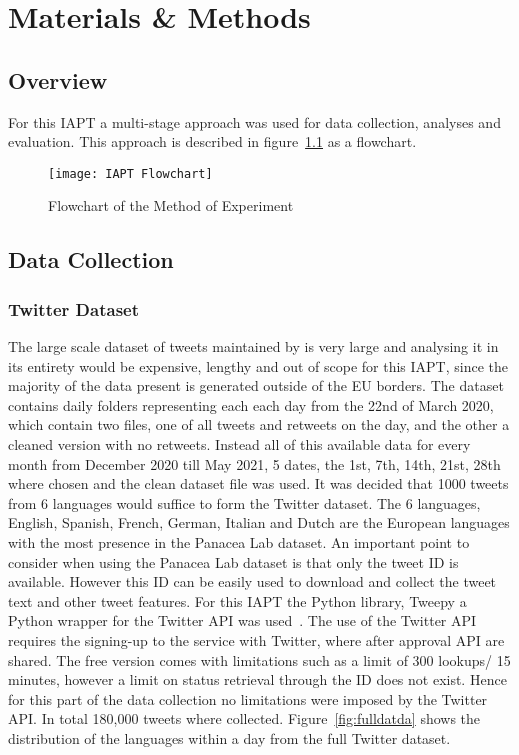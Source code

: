\chapter{Materials \& Methods}

\section{Overview}

For this \ac{IAPT} a multi-stage approach was used for data collection, analyses and evaluation.
This approach is described in figure~\ref{fig:flowchart} as a flowchart.

\begin{figure}[h!]
    \centering
    \texttt{[image: IAPT Flowchart]}
    \caption[Method Flowchart]{Flowchart of the Method of Experiment}
    \label{fig:flowchart}
\end{figure}

\section{Data Collection}

\subsection{Twitter Dataset}

The large scale dataset of tweets maintained by \citet{banda2020largescale} is very large and analysing it in its entirety would be expensive, lengthy and out of scope for this \ac{IAPT}, since the majority of the data present is generated outside of the \ac{EU} borders.
The dataset contains daily folders representing each each day from the 22nd of March 2020, which contain two files, one of all tweets and retweets on the day, and the other a cleaned version with no retweets.
Instead all of this available data for every month from December 2020 till May 2021, 5 dates, the 1st, 7th, 14th, 21st, 28th where chosen and the clean dataset file was used.
It was decided that 1000 tweets from 6 languages would suffice to form the Twitter dataset.
The 6 languages, English, Spanish, French, German, Italian and Dutch are the European languages with the most presence in the Panacea Lab dataset.
An important point to consider when using the Panacea Lab dataset is that only the tweet ID is available.
However this ID can be easily used to download and collect the tweet text and other tweet features.
For this \ac{IAPT} the Python library, Tweepy a Python wrapper for the Twitter \ac{API} was used~\citep{roesslein2020tweepy}.
The use of the Twitter \ac{API} requires the signing-up to the service with Twitter, where after approval \ac{API} are shared.
The free version comes with limitations such as a limit of 300 lookups/ 15 minutes, however a limit on status retrieval through the ID does not exist.
Hence for this part of the data collection no limitations were imposed by the Twitter \ac{API}.
In total 180,000 tweets where collected.
Figure~\ref{fig:fulldatda} shows the distribution of the languages within a day from the full Twitter dataset.

